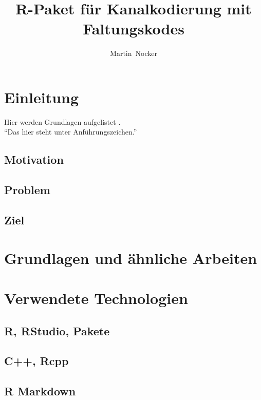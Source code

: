 \documentclass[germanthesis]{thesis-style}
\author{Martin~Nocker}
\title{R-Paket für Kanalkodierung mit Faltungskodes}
\begin{document}
\maketitle

\begin{abstract}

\end{abstract}
\begin{otherlanguage}{american}%
\begin{abstract}

\end{abstract}
\end{otherlanguage}

\tableofcontents
{}

\chapter{Einleitung}
Hier werden Grundlagen aufgelistet \cite{huffman2010fundamentals}.\\
\enquote{Das hier steht unter Anführungszeichen.}
\section{Motivation}
\section{Problem}
\section{Ziel}

\chapter{Grundlagen und ähnliche Arbeiten}

\chapter{Verwendete Technologien}
\section{R, RStudio, Pakete}
\section{C++, Rcpp}
\section{R Markdown}
\end{document}
